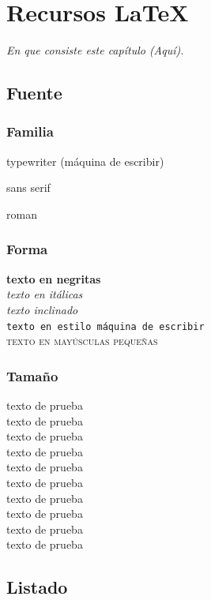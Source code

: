 \chapter{Recursos LaTeX}

\begin{center}
    \textit{En que consiste este capítulo (Aquí).}
\end{center}

\section{Fuente}

\subsection{Familia}
{\ttfamily typewriter (máquina de escribir)}

{\sffamily sans serif}

{\rmfamily roman}

\subsection{Forma}
\textbf{texto en negritas}\\
\textit{texto en itálicas}\\
\textsl{texto inclinado}\\
\texttt{texto en estilo máquina de escribir}\\
\textsc{texto en mayúsculas pequeñas}

\subsection{Tamaño}
{\tiny texto de prueba}\\
{\scriptsize texto de prueba}\\
{\footnotesize texto de prueba}\\
{\small texto de prueba}\\
{\normalsize texto de prueba}\\
{\large texto de prueba}\\
{\Large texto de prueba}\\
{\LARGE texto de prueba}\\
{\huge texto de prueba}\\
{\Huge texto de prueba}

\section{Listado}

